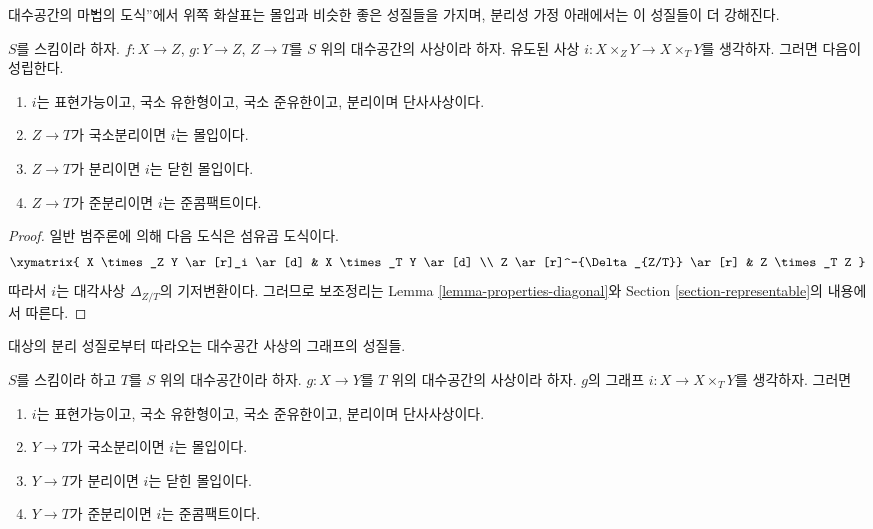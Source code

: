 \begin{lemma}
\label{lemma-fibre-product-after-map}
\begin{slogan}
대수공간의 \`\`마법의 도식''에서 위쪽 화살표는 몰입과 비슷한 좋은
성질들을 가지며, 분리성 가정 아래에서는 이 성질들이 더 강해진다.
\end{slogan}
$S$를 스킴이라 하자. $f : X \to Z$, $g : Y \to Z$, $Z \to T$를
$S$ 위의 대수공간의 사상이라 하자. 유도된 사상
$i : X \times_Z Y \to X \times_T Y$를 생각하자. 그러면 다음이 성립한다.
\begin{enumerate}
\item $i$는 표현가능이고, 국소 유한형이고, 국소 준유한이고,
분리이며 단사사상이다.
\item $Z \to T$가 국소분리이면 $i$는 몰입이다.
\item $Z \to T$가 분리이면 $i$는 닫힌 몰입이다.
\item $Z \to T$가 준분리이면 $i$는 준콤팩트이다.
\end{enumerate}
\end{lemma}

\begin{proof}
일반 범주론에 의해 다음 도식은 섬유곱 도식이다.
$$
\xymatrix{
X \times_Z Y \ar[r]_i \ar[d] & X \times_T Y \ar[d] \\
Z \ar[r]^-{\Delta_{Z/T}} \ar[r] & Z \times_T Z
}
$$
따라서 $i$는 대각사상 $\Delta_{Z/T}$의 기저변환이다.
그러므로 보조정리는 Lemma \ref{lemma-properties-diagonal}와
Section \ref{section-representable}의 내용에서 따른다.
\end{proof}

\begin{lemma}
\label{lemma-semi-diagonal}
\begin{slogan}
대상의 분리 성질로부터 따라오는 대수공간 사상의 그래프의 성질들.
\end{slogan}
$S$를 스킴이라 하고 $T$를 $S$ 위의 대수공간이라 하자.
$g : X \to Y$를 $T$ 위의 대수공간의 사상이라 하자.
$g$의 그래프 $i : X \to X \times_T Y$를 생각하자. 그러면
\begin{enumerate}
\item $i$는 표현가능이고, 국소 유한형이고, 국소 준유한이고,
분리이며 단사사상이다.
\item $Y \to T$가 국소분리이면 $i$는 몰입이다.
\item $Y \to T$가 분리이면 $i$는 닫힌 몰입이다.
\item $Y \to T$가 준분리이면 $i$는 준콤팩트이다.
\end{enumerate}
\end{lemma}

